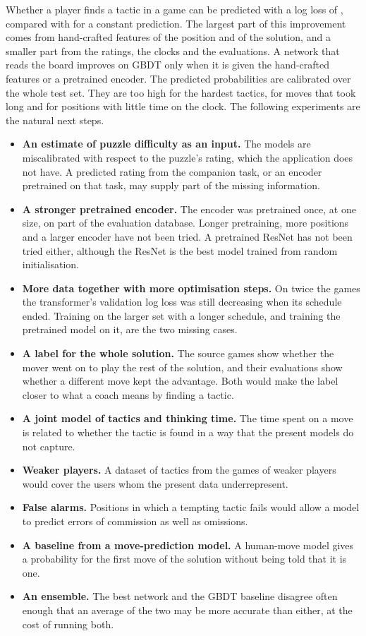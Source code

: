 \documentclass[11pt]{article}
\begin{document}
Whether a player finds a tactic in a game can be predicted with a log loss of
, compared with  for a constant prediction. The
largest part of this improvement comes from hand-crafted features of the
position and of the solution, and a smaller part from the ratings, the clocks
and the evaluations. A network that reads the board improves on GBDT
only when it is given the hand-crafted features or a pretrained encoder. The
predicted probabilities are calibrated over the whole test set. They are too
high for the hardest tactics, for moves that took long and for positions
with little time on the clock. The following experiments are the natural
next steps.
\begin{itemize}
\item \textbf{An estimate of puzzle difficulty as an input.} The models are
miscalibrated with respect to the puzzle's rating, which the application
does not have. A predicted rating from the companion task, or an encoder
pretrained on that task, may supply part of the missing information.
\ifchangestart
\item \textbf{A stronger pretrained encoder.} The encoder was pretrained
once, at one size, on part of the evaluation database. Longer pretraining,
more positions and a larger encoder have not been tried.\ifchangeconv{} A
pretrained ResNet has not been tried either, although the ResNet is the best
model trained from random initialisation.\fi
\fi
\ifmore
\item \textbf{More data together with more optimisation steps.} On twice the
games the transformer's validation log loss was still decreasing when its
schedule ended. Training on the larger set with a longer schedule, and
training the pretrained model on it, are the two missing cases.
\fi
\item \textbf{A label for the whole solution.} The source games show whether
the mover went on to play the rest of the solution, and their evaluations
show whether a different move kept the advantage. Both would make the label
closer to what a coach means by finding a tactic.
\item \textbf{A joint model of tactics and thinking time.} The time spent on
a move is related to whether the tactic is found in a way that the present
models do not capture.
\item \textbf{Weaker players.} A dataset of tactics from the games of weaker
players would cover the users whom the present data underrepresent.
\item \textbf{False alarms.} Positions in which a tempting tactic fails
would allow a model to predict errors of commission as well as omissions.
\item \textbf{A baseline from a move-prediction model.} A human-move model
gives a probability for the first move of the solution without being told
that it is one.
\item \textbf{An ensemble.} The best network and the GBDT baseline disagree
often enough that an average of the two may be more accurate than either, at
the cost of running both.
\end{itemize}
\end{document}
